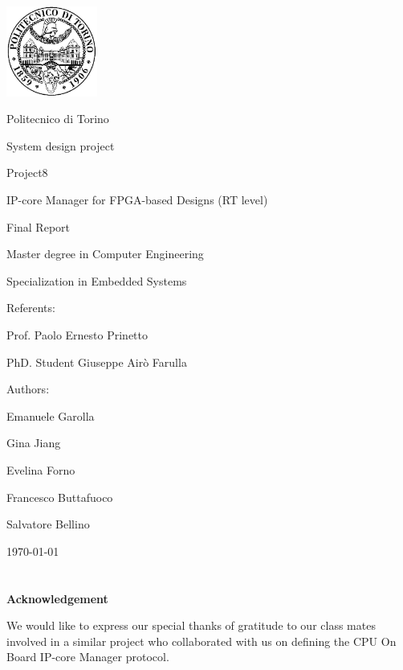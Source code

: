 \documentclass[12pt,  english, makeidx, a4paper, titlepage, oneside]{book}
\begin{document}
\frontmatter
\begin{titlepage}
\vspace{0cm}
\centerline{
\includegraphics[width=3cm]{./logopoli}} 
\vspace{0.5cm}
\centerline{\LARGE Politecnico di Torino}
\vspace{2cm}
\centerline{\Huge\sf System design project}
\vspace{1cm}
\centerline{\huge \sf Project8 }
\bigskip
\centerline{\huge\sf IP-core Manager for FPGA-based Designs (RT level)}
\bigskip
\centerline{\huge\sf Final Report}
\vspace{1.5cm}
\centerline{\Large Master degree in Computer Engineering}
\centerline{\Large Specialization in Embedded Systems}
\bigskip
\vspace{0.5cm}
%
\centerline{\large Referents: }
\centerline{\large Prof. Paolo Ernesto Prinetto}
\centerline{\large PhD. Student Giuseppe Air\`{o} Farulla}
\bigskip
\vspace{0.5cm}
%
%
\centerline{\large Authors:}
\bigskip
%
%
\centerline{\large Emanuele Garolla}
\centerline{\large Gina Jiang}
\centerline{\large Evelina Forno}
\centerline{\large Francesco Buttafuoco}
\centerline{\large Salvatore Bellino}

%
\vspace{1.5cm}
\centerline{\large \monthyeardate\today}
\end{titlepage}
 
\newenvironment{acknowledgements}%
{\cleardoublepage\thispagestyle{empty}\null\vfill\begin{center}%
		\bfseries\textbf{ \huge Acknowledgements}\end{center}}%
{\vfill\null}

\section*{}
\bigskip
\bigskip
\begin{center}
	{\huge \textbf{Acknowledgement}}
\end{center}
\bigskip
We would like to express our special thanks of gratitude to our class mates involved in a similar project who collaborated with us on defining the CPU On Board IP-core Manager protocol.
\end{document}

